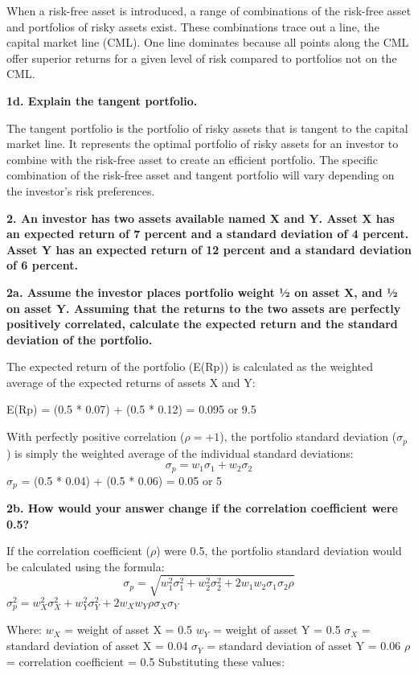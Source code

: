 \documentclass[twoside,openany]{book}
\begin{document}
When a risk-free asset is introduced, a range of combinations of the risk-free asset and portfolios of risky assets exist. These combinations trace out a line, the capital market line (CML). One line dominates because all points along the CML offer superior returns for a given level of risk compared to portfolios not on the CML.

\textbf{1d. Explain the tangent portfolio.}

The tangent portfolio is the portfolio of risky assets that is tangent to the capital market line. It represents the optimal portfolio of risky assets for an investor to combine with the risk-free asset to create an efficient portfolio. The specific combination of the risk-free asset and tangent portfolio will vary depending on the investor's risk preferences.

\textbf{2. An investor has two assets available named X and Y. Asset X has an expected return of 7 percent and a standard deviation of 4 percent. Asset Y has an expected return of 12 percent and a standard deviation of 6 percent.}

\textbf{2a. Assume the investor places portfolio weight ½ on asset X, and ½ on asset Y. Assuming that the returns to the two assets are perfectly positively correlated, calculate the expected return and the standard deviation of the portfolio.}

The expected return of the portfolio (E(Rp)) is calculated as the weighted average of the expected returns of assets X and Y:

E(Rp) = (0.5 * 0.07) + (0.5 * 0.12) = 0.095 or 9.5%

With perfectly positive correlation (\(\rho = +1\)), the portfolio standard deviation (\(\sigma_p\)) is simply the weighted average of the individual standard deviations:
\[
\sigma_p = w_1 \sigma_1 + w_2 \sigma_2
\]
$\sigma_p$ = (0.5 * 0.04) + (0.5 * 0.06) = 0.05 or 5%

\textbf{2b. How would your answer change if the correlation coefficient were 0.5?}

If the correlation coefficient (\(\rho\)) were 0.5, the portfolio standard deviation would be calculated using the formula:
\[
\sigma_p = \sqrt{w_1^2 \sigma_1^2 + w_2^2 \sigma_2^2 + 2 w_1 w_2 \sigma_1 \sigma_2 \rho}
\]
$\sigma_p^2 = w_X^2 \sigma_X^2 + w_Y^2 \sigma_Y^2 + 2w_X w_Y \rho \sigma_X \sigma_Y$

Where:
$w_X$ = weight of asset X = 0.5
$w_Y$ = weight of asset Y = 0.5
$\sigma_X$ = standard deviation of asset X = 0.04
$\sigma_Y$ = standard deviation of asset Y = 0.06
\(\rho\) = correlation coefficient = 0.5
Substituting these values:
\end{document}
